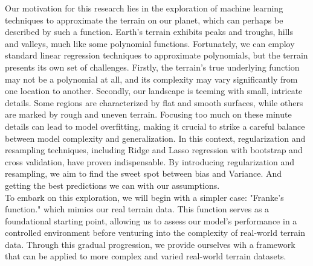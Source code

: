 \documentclass[twoside,11pt]{report}
\begin{document}
Our motivation for this research lies in the exploration of machine learning techniques to approximate 
the terrain on our planet, which can perhaps be described by such a function. Earth's terrain exhibits 
peaks and troughs, hills and valleys, much like some polynomial functions. Fortunately, we can employ 
standard linear regression techniques to approximate polynomials, but the terrain presents its own set 
of challenges. Firstly, the terrain's true underlying function may not be a polynomial at all, and its complexity may 
vary significantly from one location to another. Secondly, our landscape is teeming with small, intricate 
details. Some regions are characterized by flat and smooth surfaces, while others are marked by rough and 
uneven terrain. Focusing too much on these minute details can lead to model overfitting, making it crucial 
to strike a careful balance between model complexity and generalization.
In this context, regularization and resampling techniques, including Ridge and Lasso regression with bootstrap
and cross validation, have proven indispensable. By introducing regularization and resampling, we aim to find 
the sweet spot between bias and Variance. And getting the best predictions we can with our assumptions.\\
To embark on this exploration, we will begin with a simpler case: "Franke's function." which mimics our real terrain
data. This function 
serves as a foundational starting point, allowing us to assess our model's performance in a controlled 
environment before venturing into the complexity of real-world terrain data. Through this gradual progression, 
we provide ourselves wih a framework that can be applied to more complex and varied real-world terrain datasets.\\
\end{document}
